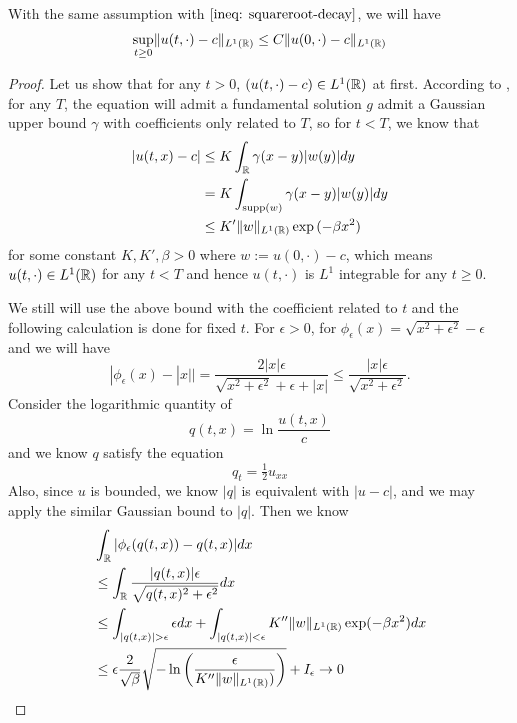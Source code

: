 \begin{theorem} With the same assumption with $\eqref{ineq: squareroot-decay}$, we will have
\[      \sup_{t\geq0}\lVert u(t,\cdot)-c\rVert_{L^1(\mathbb{R})}\leq C\lVert u(0,\cdot) - c\rVert_{L^1(\mathbb{R})} \label{eq:bump-L1-control}
\]
\end{theorem}
\begin{proof}
    Let us show that for any $t > 0$, $(u(t,\cdot)-c)\in L^1(\mathbb{R})$ at first. According to \cite{Dong_2022}, for any $T$, the equation will admit a fundamental solution $g$ admit a Gaussian upper bound $\gamma$ with coefficients only related to $T$, so for $t < T$, we know that
    \[
    \begin{aligned}
        |u(t,x) - c| &\leq K \int_{\mathbb{R}} \gamma(x-y)|w(y)|dy \\
        &= K\int_{\text{supp}(w)} \gamma(x-y)|w(y)|dy \\
        &\leq K'\lVert w\rVert_{L^1(\mathbb{R})}\exp{(-\beta x^2)}
    \end{aligned}
    \]
    for some constant $K,K',\beta>0$ where $w:= u(0,\cdot) - c$, which means $u(t,\cdot) \in L^1(\mathbb{R})$ for any $t < T$ and hence $u(t,\cdot)$ is $L^1$ integrable for any $t \geq 0$.\par
    We still will use the above bound with the coefficient related to $t$ and the following calculation is done for fixed $t$. For $\epsilon > 0$, for $\phi_{\epsilon}(x) = \sqrt{x^2 + \epsilon^2} -\epsilon$ and we will have
    \[
    |\phi_{\epsilon}(x) - |x|| = \dfrac{2|x|\epsilon}{\sqrt{x^2+\epsilon^2} + \epsilon+|x|} \leq \dfrac{|x|\epsilon}{\sqrt{x^2+\epsilon^2}}.
    \]
    Consider the logarithmic quantity of
    \[
    q(t,x) = \ln{\dfrac{u(t,x)}{c}}
    \]
    and we know $q$ satisfy the equation
    \[
    q_t = \tfrac{1}{2}u_{xx}
    \]
    Also, since $u$ is bounded, we know $|q|$ is equivalent with $|u - c|$, and we may apply the similar Gaussian bound to $|q|$.
    Then we know
    \[
    \begin{aligned}
        &\int_{\R}|\phi_{\epsilon}(q(t,x))- q(t,x)|dx \\ &\leq \int_{\R} \dfrac{|q(t,x)|\epsilon}{\sqrt{q(t,x)^2+\epsilon^2}} dx \\
        &\leq\int_{|q(t,x)|>\epsilon} \epsilon dx + \int_{|q(t,x)| < \epsilon} K''\lVert w\rVert_{L^1(\R)}\exp(-\beta x^2)dx
        \\
        &\leq \epsilon \dfrac{2}{\sqrt{\beta}}\sqrt{-\ln \left(\dfrac{\epsilon}{K''\lVert w\rVert_{L^1(\R)})}\right)} + I_{\epsilon} \to 0
    \end{aligned}
\]
\end{proof}
